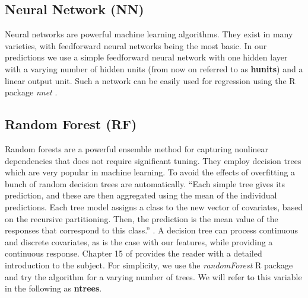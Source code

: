 \documentclass[conference]{IEEEtran}
\begin{document}
\subsection{Neural Network (NN)}
Neural networks are powerful machine learning algorithms. They exist in many varieties, with feedforward neural networks being the most basic. In our predictions we use a simple feedforward neural network with one hidden layer with a varying number of hidden units (from now on referred to as \textbf{hunits}) and a linear output unit. Such a network can be easily used for regression using the R package \emph{nnet} \cite{Venables2002}.

\subsection{Random Forest (RF)}
Random forests \cite{BreimanRF} are a powerful ensemble method for capturing nonlinear dependencies that does not require significant tuning. They employ decision trees which are very popular in machine learning. To avoid the effects of overfitting a bunch of random decision trees are automatically. ``Each simple tree gives its prediction, and these are then aggregated using the mean of the individual predictions. Each tree model assigns a class to the new vector of covariates, based on the recursive partitioning. Then, the prediction is the mean value of the responses that correspond to this class.'' \cite{Nedellec2014}. A decision tree can process continuous and discrete covariates, as is the case with our features, while providing a continuous response. Chapter 15 of \cite{hastie01statisticallearning} provides the reader with a detailed introduction to the subject. For simplicity, we use the \emph{randomForest} R package \cite{Liaw2002} and try the algorithm for a varying number of trees. We will refer to this variable in the following as \textbf{ntrees}.
\end{document}
